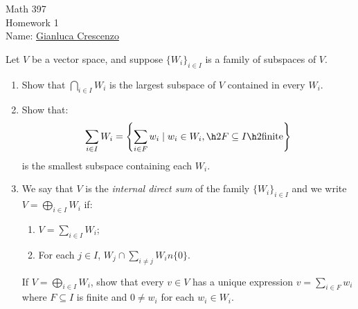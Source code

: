 \documentclass[11pt,twoside,openany]{memoir}
\begin{document}
\begin{center}
{\large Math 397 \\[0.1in]Homework 1 \\[0.1in]}
{Name:} {\underline{Gianluca Crescenzo\hspace*{2in}}}\\[0.15in]
\end{center}
\vspace{4pt}
    \begin{exercise}
        Let $V$ be a vector space, and suppose $\{W_i\}_{i \in I}$ is a family of subspaces of $V$. 
            \begin{enumerate}[label = (\arabic*),itemsep=1pt,topsep=3pt]
                \item Show that $\bigcap_{i \in I}W_i$ is the largest subspace of $V$ contained in every $W_i$.
                \item Show that:
                    \begin{equation*}
                    \begin{split}
                        \sum_{i \in I}W_i = \left\{\sum_{i \in F}w_i \mid w_i \in W_i, \h2 F \subseteq I \h2\text{finite}  \right\}
                    \end{split}
                    \end{equation*}
                is the smallest subspace containing each $W_i$.
                \item We say that $V$ is the \textit{internal direct sum} of the family $\{W_i\}_{i \in I}$ and we write $V = \bigoplus_{i \in I}W_i$ if:
                    \begin{enumerate}[label = (\roman*),itemsep=1pt,topsep=3pt]
                        \item $V = \sum_{i \in I}W_i$;
                        \item For each $j \in I$, $W_j \cap \sum_{i \neq j}W_i n \{0\}$.
                    \end{enumerate}
                If $V = \bigoplus_{i \in I}W_i$, show that every $v \in V$ has a unique expression $v = \sum_{i \in F}w_i$ where $F \subseteq I$ is finite and $0 \neq w_i$ for each $w_i \in W_i$.
            \end{enumerate}
    \end{exercise}
\end{document}
